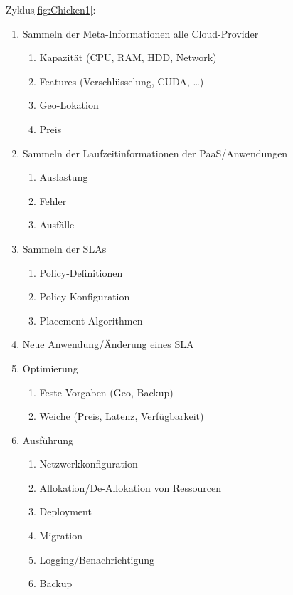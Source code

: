 Zyklus\autoref{fig:Chicken1}:

\begin{enumerate}
	
	\item Sammeln der Meta-Informationen alle Cloud-Provider
	\begin{enumerate}
		\item Kapazität (CPU, RAM, HDD, Network)
		\item Features (Verschlüsselung, CUDA, …)
		\item Geo-Lokation 
		\item Preis
	\end{enumerate}
	
	\item Sammeln der Laufzeitinformationen der PaaS/Anwendungen
	\begin{enumerate}
		\item Auslastung
		\item Fehler
		\item Ausfälle
	\end{enumerate}
	
	\item Sammeln der SLAs
	\begin{enumerate}
		\item Policy-Definitionen
		\item Policy-Konfiguration
		\item Placement-Algorithmen
	\end{enumerate}

	\item Neue Anwendung/Änderung eines SLA
	
	\item Optimierung
	\begin{enumerate}
		\item Feste Vorgaben (Geo, Backup)
		\item Weiche (Preis, Latenz, Verfügbarkeit)
	\end{enumerate}

	
	\item Ausführung
	\begin{enumerate}
		\item Netzwerkkonfiguration
		\item Allokation/De-Allokation von Ressourcen
		\item Deployment
		\item Migration
		\item Logging/Benachrichtigung
		\item Backup
	\end{enumerate}

\end{enumerate}

